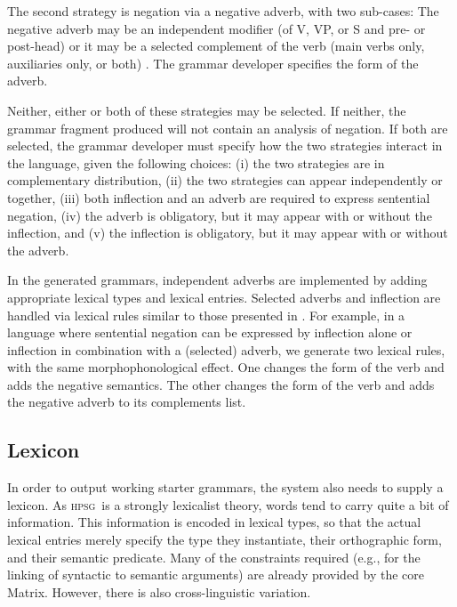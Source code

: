 \documentclass[11pt]{article}
\newcommand{\hpsg}{\textsc{hpsg}}
\begin{document}
The second strategy is negation via a negative adverb, with two
sub-cases: The negative adverb may be an independent modifier (of V,
VP, or S and pre- or post-head) or it may be a
selected complement of the verb (main verbs only, auxiliaries only, or
both) \cite{Kim00}.  The grammar developer specifies the form of the adverb.

Neither, either or both of these strategies may be selected.
If neither, the grammar
fragment produced will not contain an analysis of negation.  If both
are selected, the grammar developer must specify how the two strategies
interact in the language, given the following choices:
(i) the two strategies are in complementary distribution, (ii) the two
strategies can appear independently or together, (iii) both inflection
and an adverb are required to express sentential negation, (iv) the
adverb is obligatory, but it may appear with or without the
inflection, and (v) the inflection is obligatory, but it may appear
with or without the adverb.

In the generated grammars, independent adverbs are implemented
by adding appropriate lexical types and lexical entries.  Selected
adverbs and inflection are handled via lexical rules similar to
those presented in \cite{Sag:Was:Ben:03}.  For example, in a language
where sentential negation can be expressed by inflection alone or
inflection in combination with a (selected) adverb, we generate two
lexical rules, with the same morphophonological effect.  One changes
the form of the verb and adds the negative semantics.  The other
changes the form of the verb and adds the negative adverb to its complements
list.

\subsection{Lexicon}

In order to output working starter grammars, the system also needs to
supply a lexicon.  As \hpsg\ is a strongly lexicalist theory, words
tend to carry quite a bit of information.  This information is encoded
in lexical types, so that the actual lexical entries merely specify
the type they instantiate, their orthographic form, and their semantic
predicate.  Many of the constraints required (e.g., for the linking of
syntactic to semantic arguments) are already provided by the core
Matrix.  However, there is also cross-linguistic variation.
\end{document}
